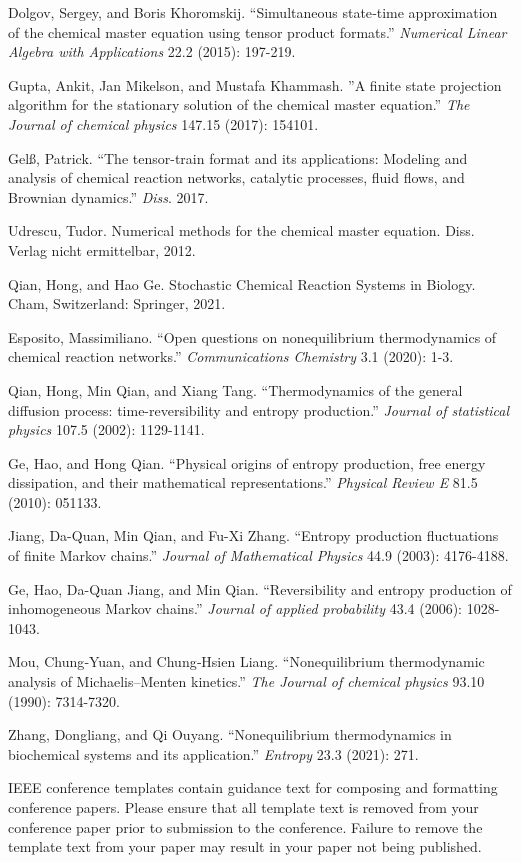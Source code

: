 \documentclass[conference]{IEEEtran}
\begin{document}
{\begin{thebibliography}{100}
 Dolgov, Sergey, and Boris Khoromskij. ``Simultaneous state‐time approximation of the chemical master equation using tensor product formats.'' {\it Numerical Linear Algebra with Applications} 22.2 (2015): 197-219.

 Gupta, Ankit, Jan Mikelson, and Mustafa Khammash. ''A finite state projection algorithm for the stationary solution of the chemical master equation.'' {\it The Journal of chemical physics} 147.15 (2017): 154101.

 Gelß, Patrick. ``The tensor-train format and its applications: Modeling and analysis of chemical reaction networks, catalytic processes, fluid flows, and Brownian dynamics.'' {\it Diss}. 2017.

 Udrescu, Tudor. Numerical methods for the chemical master equation. Diss. Verlag nicht ermittelbar, 2012.

 Qian, Hong, and Hao Ge. Stochastic Chemical Reaction Systems in Biology. Cham, Switzerland: Springer, 2021.

 Esposito, Massimiliano. ``Open questions on nonequilibrium thermodynamics of chemical reaction networks.'' {\it Communications Chemistry} 3.1 (2020): 1-3.

 Qian, Hong, Min Qian, and Xiang Tang. ``Thermodynamics of the general diffusion process: time-reversibility and entropy production.'' {\it Journal of statistical physics} 107.5 (2002): 1129-1141.

 Ge, Hao, and Hong Qian. ``Physical origins of entropy production, free energy dissipation, and their mathematical representations.'' {\it Physical Review E} 81.5 (2010): 051133.

 Jiang, Da-Quan, Min Qian, and Fu-Xi Zhang. ``Entropy production fluctuations of finite Markov chains.'' {\it Journal of Mathematical Physics} 44.9 (2003): 4176-4188.

 Ge, Hao, Da-Quan Jiang, and Min Qian. ``Reversibility and entropy production of inhomogeneous Markov chains.'' {\it Journal of applied probability} 43.4 (2006): 1028-1043.

 Mou, Chung‐Yuan, and Chung‐Hsien Liang. ``Nonequilibrium thermodynamic analysis of Michaelis–Menten kinetics.'' {\it The Journal of chemical physics} 93.10 (1990): 7314-7320.

 Zhang, Dongliang, and Qi Ouyang. ``Nonequilibrium thermodynamics in biochemical systems and its application.'' {\it Entropy} 23.3 (2021): 271.

\end{thebibliography}

\vspace{12pt}
\color{red}
IEEE conference templates contain guidance text for composing and formatting conference papers. Please ensure that all template text is removed from your conference paper prior to submission to the conference. Failure to remove the template text from your paper may result in your paper not being published.
}
\end{document}
